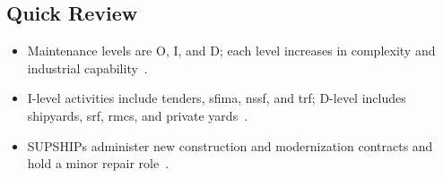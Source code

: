 \documentclass[../main.tex]{subfiles}
\begin{document}
\subsection{Quick Review}
\begin{itemize}
  \item Maintenance levels are O, I, and D; each level increases in complexity and industrial capability~\autocite{edo-4-1-1-fleet-maint-assets-2025}.
  \item I-level activities include tenders, \ac{sfima}, \ac{nssf}, and \ac{trf}; D-level includes shipyards, \ac{srf}, \acp{rmc}, and private yards~\autocite{edo-4-1-1-fleet-maint-assets-2025}.
  \item SUPSHIPs administer new construction and modernization contracts and hold a minor repair role~\autocite{edo-4-1-1-fleet-maint-assets-2025}.
\end{itemize}

\end{document}
